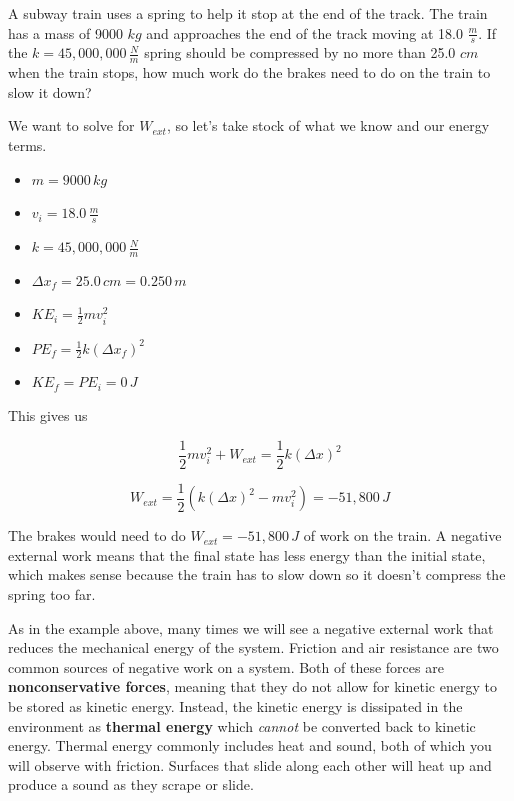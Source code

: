 \documentclass[12pt]{book}
\begin{document}
\begin{exampleblock}

A subway train uses a spring to help it stop at the end of the track. The train has a mass of 9000 $kg$ and approaches the end of the track moving at 18.0 $\frac{m}{s}$. If the $k = 45,000,000 \, \frac{N}{m}$ spring should be compressed by no more than 25.0 $cm$ when the train stops, how much work do the brakes need to do on the train to slow it down?

\hspace{10pt}

We want to solve for $W_{ext}$, so let's take stock of what we know and our energy terms.

\begin{itemize}
\item $m = 9000 \, kg$
\item $v_i = 18.0 \, \frac{m}{s}$
\item $k = 45,000,000 \, \frac{N}{m}$
\item $\Delta x_f = 25.0 \, cm = 0.250 \, m$
\item $KE_i = \frac{1}{2} m v_i^2$
\item $PE_f = \frac{1}{2} k (\Delta x_f)^2$
\item $KE_f = PE_i = 0 \, J$
\end{itemize}

This gives us

\begin{equation}
\frac{1}{2} m v_i^2 + W_{ext} = \frac{1}{2} k (\Delta x)^2
\end{equation}

\begin{equation}
W_{ext} = \frac{1}{2} (k (\Delta x)^2 - m v_i^2) = -51,800 \, J
\end{equation}

The brakes would need to do $W_{ext} = -51,800 \, J$ of work on the train. A negative external work means that the final state has less energy than the initial state, which makes sense because the train has to slow down so it doesn't compress the spring too far.

\end{exampleblock}

As in the example above, many times we will see a negative external work that reduces the mechanical energy of the system. Friction and air resistance are two common sources of negative work on a system. Both of these forces are \textbf{nonconservative forces}, meaning that they do not allow for kinetic energy to be stored as kinetic energy. Instead, the kinetic energy is dissipated in the environment as \textbf{thermal energy} which \textit{cannot} be converted back to kinetic energy. Thermal energy commonly includes heat and sound, both of which you will observe with friction. Surfaces that slide along each other will heat up and produce a sound as they scrape or slide.
\end{document}
